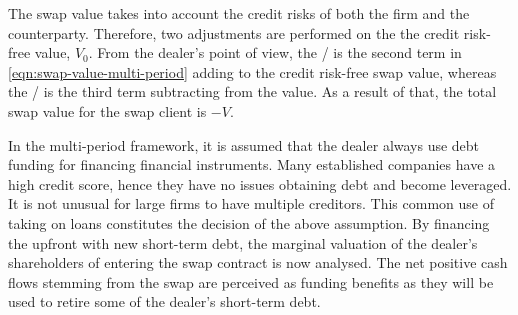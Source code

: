 \documentclass[main.tex]{subfiles}
\begin{document}
        The swap value takes into account the credit risks of both the firm and the counterparty.
        Therefore, two adjustments are performed on the the credit risk-free value, $V_0$.
        From the dealer's point of view,
        the \DVA/ is the second term in \cref{eqn:swap-value-multi-period} adding to the credit risk-free swap value,
        whereas the \CVA/ is the third term subtracting from the value.
        As a result of that, the total swap value for the swap client is $-V$.

        In the multi-period framework, it is assumed that the dealer always use debt funding for financing financial instruments.
        Many established companies have a high credit score,
        hence they have no issues obtaining debt and become leveraged.
        It is not unusual for large firms to have multiple creditors.
        This common use of taking on loans constitutes the decision of the above assumption.
        By financing the upfront with new short-term debt, the marginal valuation of the dealer's shareholders of entering the swap contract is now analysed.
        The net positive cash flows stemming from the swap are perceived as funding benefits as they will be used to retire some of the dealer's short-term debt.
        
\end{document}
